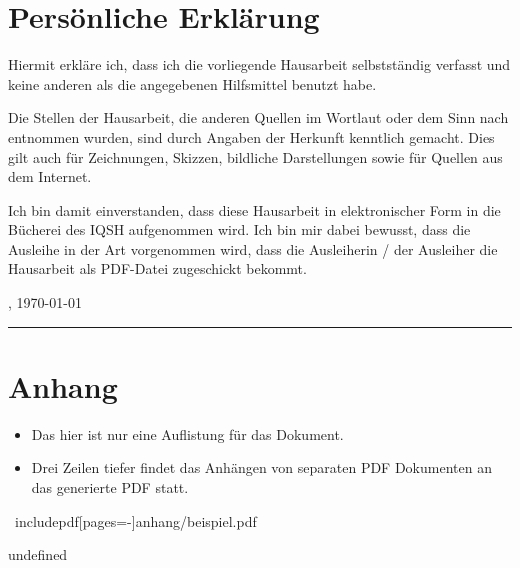 	\newpage
	\thispagestyle{empty}
	\section*{Persönliche Erklärung}
	
	Hiermit erkläre ich, dass ich die vorliegende Hausarbeit selbstständig verfasst und keine anderen als die angegebenen Hilfsmittel benutzt habe.
	
	Die Stellen der Hausarbeit, die anderen Quellen im Wortlaut oder dem Sinn nach entnommen wurden, sind durch Angaben der Herkunft kenntlich gemacht. Dies gilt auch für Zeichnungen, Skizzen, bildliche Darstellungen sowie für Quellen aus dem Internet.
	
	Ich bin damit einverstanden, dass diese Hausarbeit in elektronischer Form in die Bücherei des IQSH aufgenommen wird. Ich bin mir dabei bewusst, dass die Ausleihe in der Art vorgenommen wird, dass die Ausleiherin / der Ausleiher die Hausarbeit als PDF-Datei zugeschickt bekommt.
	
	\vspace{2 cm}
	
	\haAutorOrt, \today
	
	\vspace{1 cm}
	
	\parbox{5cm}{\hrule
		\strut \footnotesize \haAutor}
	
	
	\vfill
	\section*{Anhang}
	\begin{itemize}
		\item Das hier ist nur eine Auflistung für das Dokument.
		\item Drei Zeilen tiefer findet das Anhängen von separaten PDF Dokumenten an das generierte PDF statt.
	\end{itemize}
	
	\ includepdf[pages=-]{anhang/beispiel.pdf}
	
	


undefined
